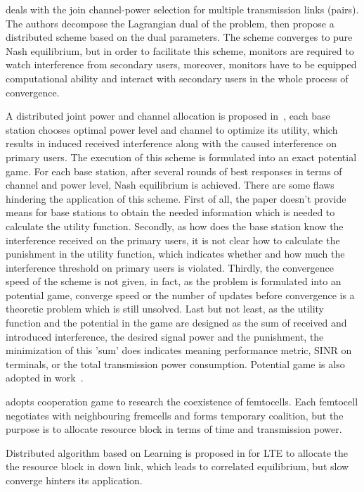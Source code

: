 \cite{wuinfocom09} deals with the join channel-power selection for multiple transmission links (pairs). 
The authors decompose the Lagrangian dual of the problem, then propose a distributed scheme based on the dual parameters. 
The scheme converges to pure Nash equilibrium, but in order to facilitate this scheme, monitors are required to watch interference from secondary users, moreover, monitors have to be equipped computational ability and interact with secondary users in the whole process of convergence.

A distributed joint power and channel allocation is proposed in~\cite{pimrc_2012}, each base station chooses optimal power level and channel to optimize its utility, which results in induced received interference along with the caused interference on primary users. 
The execution of this scheme is formulated into an exact potential game. 
For each base station, after several rounds of best responses in terms of channel and power level, Nash equilibrium is achieved.
There are some flaws hindering the application of this scheme.
First of all, the paper doesn't provide means for base stations to obtain the needed information which is needed to calculate the utility function.
Secondly, as how does the base station know the interference received on the primary users, it is not clear how to calculate the punishment in the utility function, which indicates whether and how much the interference threshold on primary users is violated.
Thirdly, the convergence speed of the scheme is not given, in fact, as the problem is formulated into an potential game, converge speed or the number of updates before convergence is a theoretic problem which is still unsolved.
Last but not least, as the utility function and the potential in the game are designed as the sum of received and introduced interference, the desired signal power and the punishment, the minimization of this 'sum' does indicates meaning  performance metric, \ie SINR on terminals, or the total transmission power consumption.
Potential game is also adopted in work~\cite{tvws_paper_networking2015}.

\cite{powerChannelAllocation_2015_shapley} adopts cooperation game to research the coexistence of femtocells.
Each femtocell negotiates with neighbouring fremcells and forms temporary coalition, but the purpose is to allocate resource block in terms of time and transmission power.

Distributed algorithm based on Learning is proposed in \cite{cogCE_huang} for LTE to allocate the the resource block in down link, which leads to correlated equilibrium, but slow converge hinters its application.

